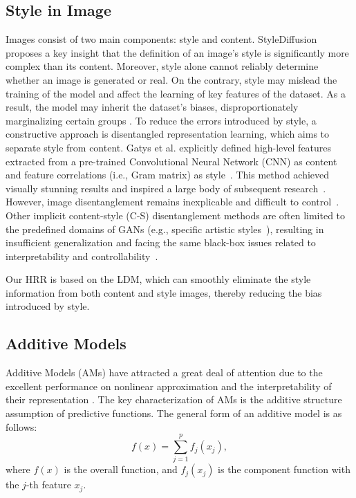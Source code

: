\subsection{Style in Image}

Images consist of two main components: style and content. StyleDiffusion~\cite{wang2023stylediffusion} proposes a key insight that the definition of an image's style is significantly more complex than its content. Moreover,  style alone cannot reliably determine whether an image is generated or real. On the contrary, style may mislead the training of the model and affect the learning of key features of the dataset. As a result, the model may inherit the dataset's biases, disproportionately marginalizing certain groups \cite{cazenavette2024fakeinversion}.
To reduce the errors introduced by style, a constructive approach is disentangled representation learning, which aims to separate style from content. Gatys et al. explicitly defined high-level features extracted from a pre-trained Convolutional Neural Network (CNN) as content and feature correlations (i.e., Gram matrix) as style~\cite{gatys2016image}. This method achieved visually stunning results and inspired a large body of subsequent research~\cite{li2017universal,an2021artflow}. However, image disentanglement remains inexplicable and difficult to control~\cite{gatys2016image}. Other implicit content-style (C-S) disentanglement methods are often limited to the predefined domains of GANs (e.g., specific artistic styles~\cite{sanakoyeu2018style}), resulting in insufficient generalization and facing the same black-box issues related to interpretability and controllability~\cite{locatello2019challenging}.

Our HRR is based on the LDM, which can smoothly eliminate the style information from both content and style images, thereby reducing the bias introduced by style.



\subsection{Additive Models}

Additive Models (AMs) have attracted a great deal of attention due to the excellent performance on nonlinear approximation and the interpretability of their representation \cite{Meier2009High,yuan2023sparse}. The key characterization of AMs is the additive structure assumption of predictive functions.  The general form of an additive model is as follows:
\begin{equation}
	f(x)=\sum^{p}_{j=1}f_j(x_j),
\end{equation}
where $f(x)$ is the overall function, and $f_j(x_{j})$ is the component function with the $j$-th feature $x_j$.

